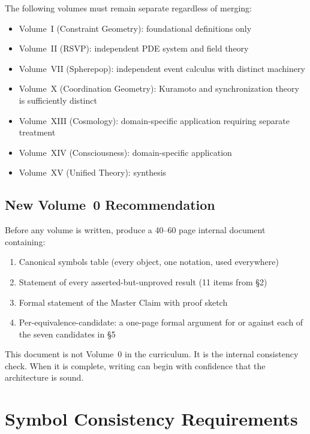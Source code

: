 \documentclass[11pt, a4paper]{article}
\begin{document}
The following volumes must remain separate regardless of merging:

\begin{itemize}
\item Volume~I (Constraint Geometry): foundational definitions only
\item Volume~II (RSVP): independent PDE system and field theory
\item Volume~VII (Spherepop): independent event calculus with distinct machinery
\item Volume~X (Coordination Geometry): Kuramoto and synchronization
  theory is sufficiently distinct
\item Volume~XIII (Cosmology): domain-specific application requiring
  separate treatment
\item Volume~XIV (Consciousness): domain-specific application
\item Volume~XV (Unified Theory): synthesis
\end{itemize}

\subsection{New Volume~0 Recommendation}

\begin{notebox}
Before any volume is written, produce a 40--60 page internal document
containing:
\begin{enumerate}
\item Canonical symbols table (every object, one notation, used
  everywhere)
\item Statement of every asserted-but-unproved result (11 items from §2)
\item Formal statement of the Master Claim with proof sketch
\item Per-equivalence-candidate: a one-page formal argument for or
  against each of the seven candidates in §5
\end{enumerate}
This document is not Volume~0 in the curriculum. It is the internal
consistency check. When it is complete, writing can begin with
confidence that the architecture is sound.
\end{notebox}

\section{Symbol Consistency Requirements}
\end{document}
